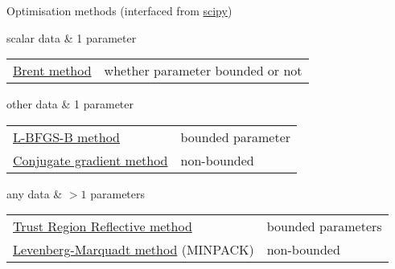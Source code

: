 \begin{frame}{Optimisation methods (interfaced from \href{https://docs.scipy.org/doc/}{scipy})}
\hfill

\begin{block}{scalar data \& 1 parameter}
\begin{tabular}{ll}
\href{https://docs.scipy.org/doc/scipy/reference/generated/scipy.optimize.minimize_scalar.html}{Brent method} & whether  parameter bounded or not
\end{tabular}\end{block}

\begin{block}{other data \& 1 parameter}
\begin{tabular}{ll}
\href{https://docs.scipy.org/doc/scipy/reference/generated/scipy.optimize.minimize.html
}{L-BFGS-B method} &bounded parameter\\[.5ex]
\href{https://docs.scipy.org/doc/scipy/reference/generated/scipy.optimize.minimize.html}{Conjugate gradient method} &non-bounded
\\
\end{tabular}\end{block}
\begin{block}{any data \& $>1$ parameters}
\begin{tabular}{ll}
\href{https://docs.scipy.org/doc/scipy/reference/generated/scipy.optimize.least_squares.html}{Trust Region Reflective method} &bounded parameters\\[.5ex]
\href{https://docs.scipy.org/doc/scipy/reference/generated/scipy.optimize.leastsq.html}{Levenberg-Marquadt method} (MINPACK) &non-bounded
\end{tabular}\end{block}
\end{frame}
